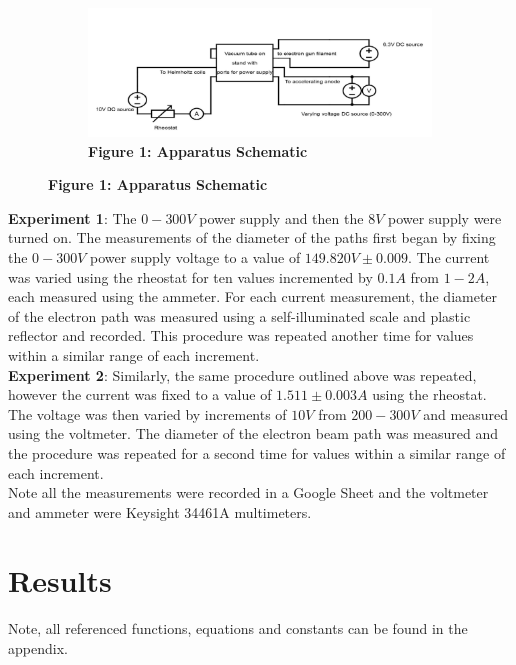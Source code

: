 \documentclass[
	letterpaper, %
	10pt, %
]{CSUniSchoolLabReport}
\begin{document}
\begin{figure}[H]
	\begin{subfigure}{\textwidth}
		\includegraphics[width=\textwidth]{../figures/apparatus.png}
		\caption{\textbf{Figure 1: Apparatus Schematic}}
	\end{subfigure}
\end{figure}

\textbf{Experiment 1}: The $0-300 V$ power supply and then the $8 V$ power supply were turned on.
The measurements of the diameter of the paths first began by fixing the $0-300 V$ power supply
voltage to a value of $149.820 V \pm 0.009$. The current was varied using the rheostat for ten values
incremented by $0.1 A$ from $1-2 A$, each measured using the ammeter. For each current measurement,
the diameter of the electron path was measured using a self-illuminated scale and plastic
reflector and recorded. This procedure was repeated another time for values within a
similar range of each increment.\\

\textbf{Experiment 2}: Similarly, the same procedure outlined above was repeated, however the
current was fixed to a value of $1.511\pm 0.003 A$ using the rheostat. The voltage was then varied by
increments of $10 V$ from $200-300 V$ and measured using the voltmeter. The diameter of the
electron beam path was measured and the procedure was repeated for a second time for values
within a similar range of each increment.\\

Note all the measurements were recorded in a Google Sheet and the voltmeter and ammeter were Keysight 34461A multimeters.\\
\section{Results}
Note, all referenced functions, equations and constants can be found in the appendix.\\
\end{document}
